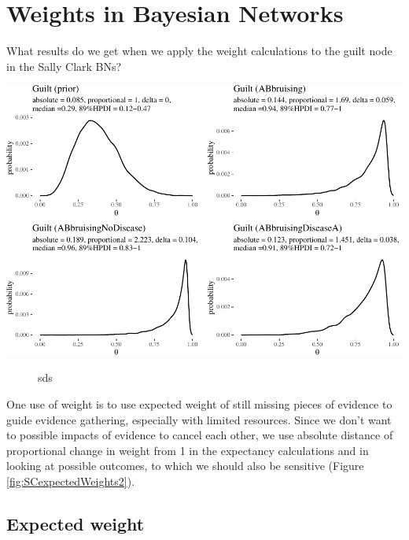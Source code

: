 \documentclass[
  10pt,
  dvipsnames,enabledeprecatedfontcommands]{scrartcl}
\begin{document}

\hypertarget{weights-in-bayesian-networks}{%
\section{Weights in Bayesian
Networks}\label{weights-in-bayesian-networks}}

What results do we get when we apply the weight calculations to the
guilt node in the Sally Clark BNs?

\begin{center}\includegraphics[width=1\linewidth]{imprecision_weight_files/figure-latex/fig:entropies19-1} \end{center}

\begin{figure}


\caption{sds}
\label{ig:entropies2}
\end{figure}

One use of weight is to use expected weight of still missing pieces of
evidence to guide evidence gathering, especially with limited resources.
Since we don't want to possible impacts of evidence to cancel each
other, we use absolute distance of proportional change in weight from 1
in the expectancy calculations and in looking at possible outcomes, to
which we should also be sensitive (Figure \ref{fig:SCexpectedWeights2}).

\hypertarget{expected-weight}{%
\subsection{Expected weight}\label{expected-weight}}
\end{document}

